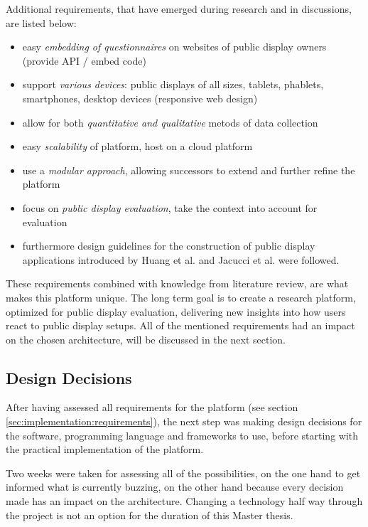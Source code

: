 	Additional requirements, that have emerged during research and in discussions, are listed below:

	\begin{itemize}[itemsep=0pt] 
	\item easy \textit{embedding of questionnaires} on websites of public display owners (provide API / embed code)
	\item support \textit{various devices}: public displays of all sizes, tablets, phablets, smartphones, desktop devices (responsive web design)
	\item allow for both \textit{quantitative and qualitative} metods of data collection
	\item easy \textit{scalability} of platform, host on a cloud platform
	\item use a \textit{modular approach}, allowing successors to extend and further refine the platform
	\item focus on \textit{public display evaluation}, take the context into account for evaluation
	\item furthermore design guidelines for the construction of public display applications introduced by Huang et al. \cite{huang2008overcoming} and Jacucci et al. \cite{jacucci2010worldsofinformation} were followed.
	\end{itemize}

	These requirements combined with knowledge from literature review, are what makes this platform unique. The long term goal is to create a research platform, optimized for public display evaluation, delivering new insights into how users react to public display setups. All of the mentioned requirements had an impact on the chosen architecture, will be discussed in the next section.



\subsection{Design Decisions}
\label{sec:implementation:design-decisions}

	After having assessed all requirements for the platform (see section \ref{sec:implementation:requirements}), the next step was making design decisions for the software, programming language and frameworks to use, before starting with the practical implementation of the platform. 

	Two weeks were taken for assessing all of the possibilities, on the one hand to get informed what is currently buzzing, on the other hand because every decision made has an impact on the architecture. Changing a technology half way through the project is not an option for the duration of this Master thesis.


